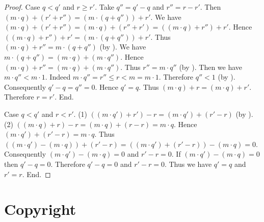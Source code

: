 \documentclass{article}
\begin{document}
\begin{forthel}
\begin{proof}
      Case $q < q'$ and $r \geq r'$.
        Take $q'' = q' - q$ and $r'' = r - r'$.
        Then $(m \cdot q) + (r' + r'') = (m \cdot (q + q'')) + r'$.
        We have $(m \cdot q) + (r' + r'')
          = (m \cdot q) + (r'' + r')
          = ((m \cdot q) + r'') + r'$.
        Hence $((m \cdot q) + r'') + r' = (m \cdot (q + q'')) + r'$.
        Thus $(m \cdot q) + r'' = m \cdot (q + q'')$ (by ).
        We have $m \cdot (q + q'') = (m \cdot q) + (m \cdot q'')$.
        Hence $(m \cdot q) + r'' = (m \cdot q) + (m \cdot q'')$.
        Thus $r'' = m \cdot q''$ (by ).
        Then we have $m \cdot q'' < m \cdot 1$.
        Indeed $m \cdot q''
          = r''
          \leq r
          < m
          = m \cdot 1$.
        Therefore $q'' < 1$ (by ).
        Consequently $q' - q = q'' = 0$.
        Hence $q' = q$.
        Thus $(m \cdot q) + r = (m \cdot q) + r'$.
        Therefore $r = r'$.
      End.

      Case $q < q'$ and $r < r'$.
        (1) $((m \cdot q') + r') - r = (m \cdot q') + (r' - r)$ (by ).
        (2) $((m \cdot q) + r) - r
          = (m \cdot q) + (r - r)
          = m \cdot q$.
        Hence $(m \cdot q') + (r' - r) = m \cdot q$.
        Thus $((m \cdot q') - (m \cdot q)) + (r' - r)
          = ((m \cdot q') + (r' - r)) - (m \cdot q)
          = 0$.
        Consequently $(m \cdot q') - (m \cdot q) = 0$ and $r' - r = 0$.
        If $(m \cdot q') - (m \cdot q) = 0$ then $q' - q = 0$.
        Therefore $q' - q = 0$ and $r' - r = 0$.
        Thus we have $q' = q$ and $r' = r$.
      End.
    \end{proof}
  \end{forthel}

  \printbibliography

  \section*{Copyright}
  \doclicenseThis
\end{document}
